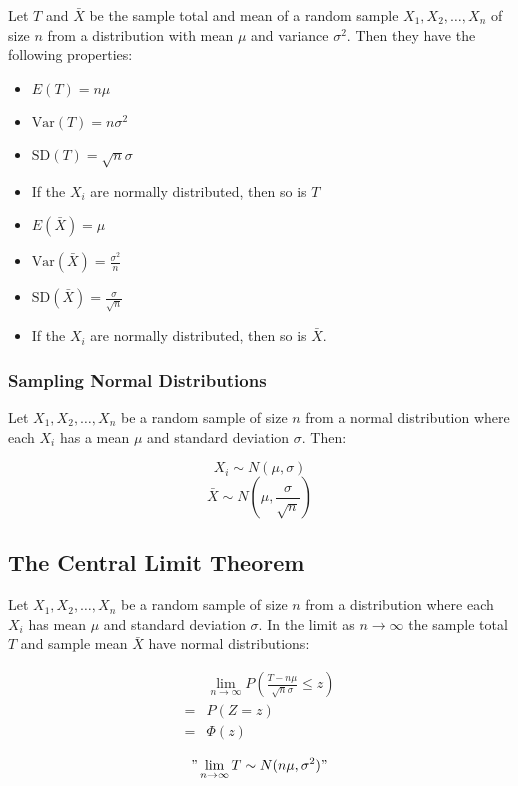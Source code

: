 Let $T$ and $\bar{X}$ be the sample total and mean of a random sample $X_1,X_2,\ldots,X_n$ of size $n$ from a distribution with mean $\mu$ and variance $\sigma^2$.
Then they have the following properties:

\begin{itemize}
    \item $E(T) = n\mu$
    \item $\text{Var}(T)=n\sigma^2$
    \item $\text{SD}(T)=\sqrt{n}\sigma$
    \item If the $X_i$ are normally distributed, then so is $T$
    \item $E(\bar{X}) = \mu$
    \item $\text{Var}(\bar{X}) = \frac{\sigma^2}{n}$
    \item $\text{SD}(\bar{X}) = \frac{\sigma}{\sqrt{n}}$
    \item If the $X_i$ are normally distributed, then so is $\bar{X}$.
\end{itemize}

\subsubsection{Sampling Normal Distributions}

Let $X_1,X_2,\ldots,X_n$ be a random sample of size $n$ from a normal distribution where each $X_i$ has a mean $\mu$ and standard deviation $\sigma$.
Then:

$$ X_i \sim N(\mu,\sigma) $$
$$ \bar{X} \sim N(\mu,\frac{\sigma}{\sqrt{n}}) $$

\subsection{The Central Limit Theorem}

Let $X_1,X_2,\ldots,X_n$ be a random sample of size $n$ from a distribution where each $X_i$ has mean $\mu$ and standard deviation $\sigma$. In the limit as $n\to \infty$ the sample total $T$ and sample mean $\bar{X}$ have normal distributions:

\begin{align*}
      & \lim_{n\to\infty} P\left(\frac{T-n\mu}{\sqrt{n} \sigma}\leq z\right) \\
    = & P(Z=z)                                                               \\
    = & \Phi(z)
\end{align*}

$$"\lim_{n\to\infty}T\sim N(n\mu,\sigma^2)"$$

